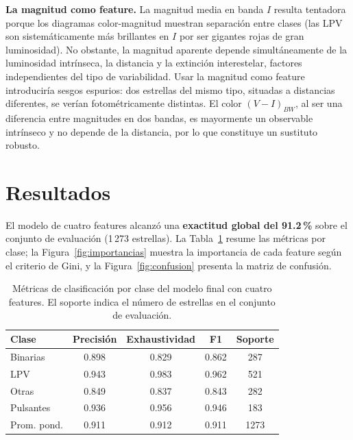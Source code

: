 \documentclass[letterpaper,12pt]{extarticle}
\begin{document}
\textbf{La magnitud como feature.}
La magnitud media en banda $I$ resulta tentadora porque los diagramas
color-magnitud muestran separación entre clases (las LPV son sistemáticamente
más brillantes en $I$ por ser gigantes rojas de gran luminosidad). No obstante,
la magnitud aparente depende simultáneamente de la luminosidad intrínseca, la
distancia y la extinción interestelar, factores independientes del tipo de
variabilidad. Usar la magnitud como feature introduciría sesgos espurios: dos
estrellas del mismo tipo, situadas a distancias diferentes, se verían
fotométricamente distintas. El color $(V-I)_{BW}$, al ser una diferencia entre
magnitudes en dos bandas, es mayormente un observable intrínseco y no depende de
la distancia, por lo que constituye un sustituto robusto.

\section{Resultados}

El modelo de cuatro features alcanzó una \textbf{exactitud global del 91.2\,\%}
sobre el conjunto de evaluación (1\,273 estrellas). La Tabla~\ref{tab:metricas}
resume las métricas por clase; la Figura~\ref{fig:importancias} muestra la
importancia de cada feature según el criterio de Gini, y la
Figura~\ref{fig:confusion} presenta la matriz de confusión.

\begin{table}[H]
    \centering
    \caption{Métricas de clasificación por clase del modelo final con cuatro
    features. El soporte indica el número de estrellas en el conjunto de evaluación.}
    \label{tab:metricas}
    \begin{tabular}{lcccc}
        \toprule
        Clase       & Precisión & Exhaustividad & F1    & Soporte \\
        \midrule
        Binarias    & 0.898     & 0.829         & 0.862 & 287 \\
        LPV         & 0.943     & 0.983         & 0.962 & 521 \\
        Otras       & 0.849     & 0.837         & 0.843 & 282 \\
        Pulsantes   & 0.936     & 0.956         & 0.946 & 183 \\
        \midrule
        Prom. pond. & 0.911     & 0.912         & 0.911 & 1273 \\
        \bottomrule
    \end{tabular}
\end{table}
\end{document}
